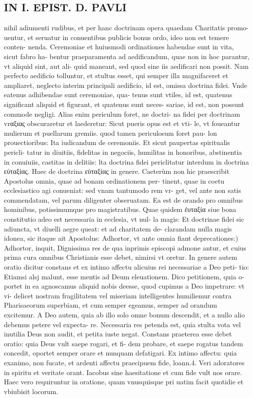 \documentclass{article}
\begin{document}
\begin{pages}
\section*{IN I. EPIST. D. PAVLI }
\marginpar{[ p.64 ]}\pstart nihil adiumenti rudibus, et per hanc doctrinam opera quaedam Charitatis promo- uentur, et seruatur in conuentibus publicis bonus ordo, ideo non est temere conten- nenda. Ceremoniae et huiusmodi ordinationes habendae sunt in vita, sicut fabro ha- bentur praeparamenta ad aedificandum, quae non in hoc parantur, vt aliquid sint, aut ali- quid maneant, sed quod sine iis aedificari non possit. Nam perfecto aedificio tolluntur, et stultus esset, qui semper illa magnifaceret et ampliaret, neglecto interim principali aedificio, id est, omissa doctrina fidei. Vnde eatenus adhibendae sunt ceremoniae, qua- tenus sunt vtiles, id est, quatenus significant aliquid et figurant, et quatenus sunt neces- sariae, id est, non possunt commode negligi. Alias enim periculum foret, ne doctri- na fidei per doctrinam vrαξιας obscuraretur et laederetur: Sicut pueris opus est et vti- le, vt foueantur mulierum et puellarum gremiis. quod tamen periculosum foret pau- lon prouectioribus: Ita iudicandum de ceremoniis. Et sicut paupertas spiritualis pericli- tatur in diuitiis, fidelitas in negociis, humilitas in honoribus, abstinentia in conuiuiis, castitas in delitiis: lta doctrina fidei periclitatur interdum in doctrina εὐταξίας. Haec de doctrina εὐταξίας in genere.  \pend\pstart Caeterùm non hic praescribit Apostolus omnia, quae ad bonam ordinationem per- tinent, quae in coetu ecclesiastico agi conueniat: sed vnam tantumodo rem vr- get, vel ante non satis commendatam, vel parum diligenter obseruatam. Ea est de orando pro omnibus hominibus, potissimumque pro magistratibus. Quae quidem ἐυταξία siue bona constitutio adeo est necessaria in ecclesia, vt nul- la magis: Et doctrinae fidei sic adiuncta, vt diuelli aegre queat: et ad charitatem de- clarandam nulla magis idonea, sic itaque  ait Apostolus: Adhortor, vt ante omnia fiant deprecationes:) Adhortor, inquit, Dignissima res de qua inprimis episcopi admone antur, et cuius prima cura omnibus Christianis esse debet, nimirsi vt oretur. In genere autem oratio dicitur constans et ex intimo affectu alicuius rei necessariae a Deo peti- tio: Etiamsi alsj malunt, esse mentis ad Deum eleuationem. Dico petitionem, quia o- portet in ea agnoscamus aliquid nobis deesse, quod cupimus a Deo impetrare: vt vi- delicet nostram fragilitatem vel miseriam intelligentes humiliemur contra Pharisaeorum superbiam, et cum semper egeamus, semper ad orandum excitemur. A Deo autem, quia ab illo solo omne bonum descendit, et a nullo alio debemus petere vel expecta- re. Necessaria res petenda est, quia stulta vota vel inutilia Deus non audit, et petita iuste negat. Constans praeterea esse debet oratio: quia Deus vult saepe rogari, et fi- dem probare, et saepe rogatus tandem concedit, oportet semper orare et nunquam defatigari. Ex intimo affectu: quia exanimo, non fucate, et ardenti affectu praecipuem fide, loann.4. Veri adoratores in spiritu et veritate orant. Iacobus sine haesitatione et cum fide vult nos orare. Haec vero requiruntur in oratione, quam vnusquisque  pri uatim facit quotidie et vbiubisit locorum. 
\end{pages}
\end{document}
